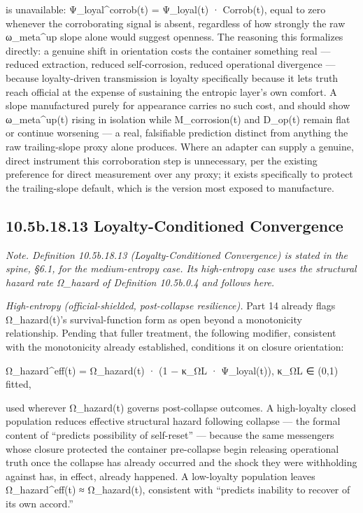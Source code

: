 \documentclass[
]{article}
\begin{document}
is unavailable: Ψ\_loyal\^{}corrob(t) = Ψ\_loyal(t) · Corrob(t), equal
to zero whenever the corroborating signal is absent, regardless of how
strongly the raw ω\_meta\^{}up slope alone would suggest openness. The
reasoning this formalizes directly: a genuine shift in orientation costs
the container something real --- reduced extraction, reduced
self-corrosion, reduced operational divergence --- because
loyalty-driven transmission is loyalty specifically because it lets
truth reach official at the expense of sustaining the entropic layer's
own comfort. A slope manufactured purely for appearance carries no such
cost, and should show ω\_meta\^{}up(t) rising in isolation while
M\_corrosion(t) and D\_op(t) remain flat or continue worsening --- a
real, falsifiable prediction distinct from anything the raw
trailing-slope proxy alone produces. Where an adapter can supply a
genuine, direct instrument this corroboration step is unnecessary, per
the existing preference for direct measurement over any proxy; it exists
specifically to protect the trailing-slope default, which is the version
most exposed to manufacture.

\hypertarget{b.18.13-loyalty-conditioned-convergence}{%
\subsection{10.5b.18.13 Loyalty-Conditioned
Convergence}\label{b.18.13-loyalty-conditioned-convergence}}

\emph{Note. Definition 10.5b.18.13 (Loyalty-Conditioned Convergence) is
stated in the spine, §6.1, for the medium-entropy case. Its high-entropy
case uses the structural hazard rate Ω\_hazard of Definition 10.5b.0.4
and follows here.}

\emph{High-entropy (official-shielded, post-collapse resilience).} Part
14 already flags Ω\_hazard(t)'s survival-function form as open beyond a
monotonicity relationship. Pending that fuller treatment, the following
modifier, consistent with the monotonicity already established,
conditions it on closure orientation:

Ω\_hazard\^{}eff(t) = Ω\_hazard(t) · (1 − κ\_ΩL · Ψ\_loyal(t)), κ\_ΩL ∈
(0,1) fitted,

used wherever Ω\_hazard(t) governs post-collapse outcomes. A
high-loyalty closed population reduces effective structural hazard
following collapse --- the formal content of ``predicts possibility of
self-reset'' --- because the same messengers whose closure protected the
container pre-collapse begin releasing operational truth once the
collapse has already occurred and the shock they were withholding
against has, in effect, already happened. A low-loyalty population
leaves Ω\_hazard\^{}eff(t) ≈ Ω\_hazard(t), consistent with ``predicts
inability to recover of its own accord.''
\end{document}
